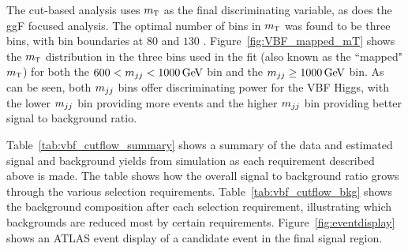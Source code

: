 The cut-based analysis uses $m_{\textrm{\footnotesize\sc t}}$ as the final discriminating variable, as does the ggF focused analysis. The optimal number of bins in $m_{\textrm{\footnotesize\sc t}}$ was found to be three bins, with bin boundaries at $80$ and $130$ \GeV. Figure~\ref{fig:VBF_mapped_mT} shows the $m_{\textrm{\footnotesize\sc t}}$ distribution in the three bins used in the fit (also known as the ``mapped" $m_{\textrm{\footnotesize\sc t}}$) for both the $600 < \mjj < 1000 \GeV$ bin and the $\mjj \geq 1000 \GeV$ bin. As can be seen, both $m_{jj}$ bins offer discriminating power for the VBF Higgs, with the lower $m_{jj}$ bin providing more events and the higher $m_{jj}$ bin providing better signal to background ratio. 

Table~\ref{tab:vbf_cutflow_summary} shows a summary of the data and estimated signal and background yields from simulation as each requirement described above is made. The table shows how the overall signal to background ratio grows through the various selection requirements. Table~\ref{tab:vbf_cutflow_bkg} shows the background composition after each selection requirement, illustrating which backgrounds are reduced most by certain requirements. Figure~\ref{fig:eventdisplay} shows an ATLAS event display of a candidate event in the final signal region. 

